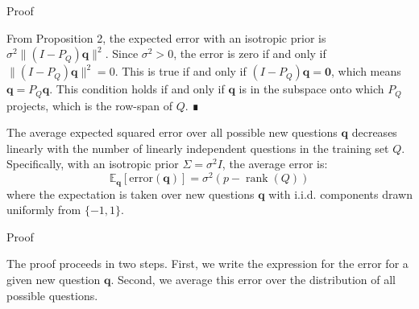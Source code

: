 \documentclass[
  11pt,
  letterpaper,
  DIV=11,
  numbers=noendperiod,
  oneside]{scrartcl}
\providecommand{\tightlist}{%
  \setlength{\itemsep}{0pt}\setlength{\parskip}{0pt}}\usepackage{longtable,booktabs,array}
\newcommand{\bm}[1]{\boldsymbol{#1}}
\begin{document}
Proof

From Proposition 2, the expected error with an isotropic prior is
\(\sigma^2 \|(I-P_Q)\bm q\|^2\). Since \(\sigma^2 > 0\), the error is
zero if and only if \(\|(I-P_Q)\bm q\|^2 = 0\). This is true if and only
if \((I-P_Q)\bm q = \bm 0\), which means \(\bm q = P_Q \bm q\). This
condition holds if and only if \(\bm q\) is in the subspace onto which
\(P_Q\) projects, which is the row-span of \(Q\). ∎

\begin{description}
\tightlist
\item[Proposition 3 (Error decreases linearly with the number of
independent questions).]
The average expected squared error over all possible new questions
\(\bm{q}\) decreases linearly with the number of linearly independent
questions in the training set \(Q\). Specifically, with an isotropic
prior \(\Sigma = \sigma^2 I\), the average error is:
\[\mathbb{E}_{\bm{q}}[\text{error}(\bm{q})] = \sigma^2 (p - \operatorname{rank}(Q))\]
where the expectation is taken over new questions \(\bm{q}\) with i.i.d.
components drawn uniformly from \(\{-1,1\}\).
\end{description}

Proof

The proof proceeds in two steps. First, we write the expression for the
error for a given new question \(\bm q\). Second, we average this error
over the distribution of all possible questions.
\end{document}
